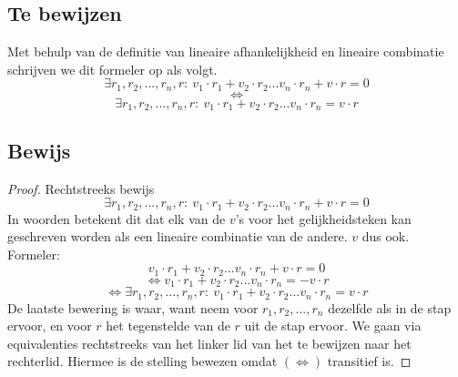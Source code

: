 \documentclass[10pt,a4paper]{article}
\begin{document}
\subsection{Te bewijzen}
Met behulp van de definitie van lineaire afhankelijkheid en lineaire combinatie schrijven we dit formeler op als volgt.
\[
\exists r_1,r_2,...,r_n,r:\ v_1\cdot r_1 + v_2\cdot r_2...v_n \cdot r_n + v \cdot r = 0
\]
\[\Leftrightarrow \]
\[\exists r_1,r_2,...,r_n,r:\ v_1\cdot r_1 + v_2\cdot r_2...v_n \cdot r_n = v \cdot r \]
\subsection{Bewijs}
\begin{proof}
Rechtstreeks bewijs
\[
\exists r_1,r_2,...,r_n,r:\ v_1\cdot r_1 + v_2\cdot r_2...v_n \cdot r_n + v \cdot r = 0
\]
In woorden betekent dit dat elk van de $v$'s voor het gelijkheidsteken kan geschreven worden als een lineaire combinatie van de andere. $v$ dus ook.\\
Formeler:
\[
v_1\cdot r_1 + v_2\cdot r_2...v_n \cdot r_n + v \cdot r = 0
\]
\[
\Leftrightarrow v_1\cdot r_1 + v_2\cdot r_2...v_n \cdot r_n = - v \cdot r 
\]
\[\Leftrightarrow \exists r_1,r_2,...,r_n,r:\ v_1\cdot r_1 + v_2\cdot r_2...v_n \cdot r_n = v \cdot r \]
De laatste bewering is waar, want neem voor $r_1,r_2,...,r_n$ dezelfde als in de stap ervoor, en voor $r$ het tegenstelde van de $r$ uit de stap ervoor.
We gaan via equivalenties rechtstreeks van het linker lid van het te bewijzen naar het rechterlid. Hiermee is de stelling bewezen omdat $(\Leftrightarrow)$ transitief is.
\end{proof}
\end{document}
